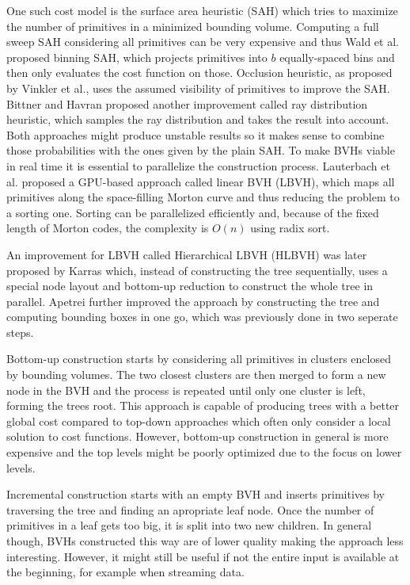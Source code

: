 One such cost model is the surface area heuristic (SAH)\cite{goldsmith_automatic_1987,macdonald_heuristics_1990} which tries to maximize the number of primitives in a minimized bounding volume. Computing a full sweep SAH considering all primitives can be very expensive and thus Wald et al.\cite{wald07fastConstruction} proposed binning SAH, which projects primitives into $b$ equally-spaced bins and then only evaluates the cost function on those.
Occlusion heuristic, as proposed by Vinkler et al.\cite{vinkler12visibility}, uses the assumed visibility of primitives to improve the SAH. Bittner and Havran\cite{bittner09rdh} proposed another improvement called ray distribution heuristic, which samples the ray distribution and takes the result into account. Both approaches might produce unstable results so it makes sense to combine those probabilities with the ones given by the plain SAH. 
To make BVHs viable in real time it is essential to parallelize the construction process. Lauterbach et al.\cite{lauterbach09lbvh} proposed a GPU-based approach called linear BVH (LBVH), which maps all primitives along the space-filling Morton curve\cite{morton66curve} and thus reducing the problem to a sorting one. Sorting can be parallelized efficiently and, because of the fixed length of Morton codes, the complexity is $O(n)$ using radix sort. 

An improvement for LBVH called Hierarchical LBVH (HLBVH) was later proposed by Karras\cite{karras12lbvh} which, instead of constructing the tree sequentially, uses a special node layout and bottom-up reduction to construct the whole tree in parallel. Apetrei\cite{apetrei14lbvh} further improved the approach by constructing the tree and computing bounding boxes in one go, which was previously done in two seperate steps. 

Bottom-up construction\cite{Walter2008FastAC} starts by considering all primitives in clusters enclosed by bounding volumes. The two closest clusters are then merged to form a new node in the BVH and the process is repeated until only one cluster is left, forming the trees root. 
This approach is capable of producing trees with a better global cost compared to top-down approaches which often only consider a local solution to cost functions. However, bottom-up construction in general is more expensive and the top levels might be poorly optimized due to the focus on lower levels.

Incremental construction\cite{goldsmith_automatic_1987} starts with an empty BVH and inserts primitives by traversing the tree and finding an apropriate leaf node. Once the number of primitives in a leaf gets too big, it is split into two new children. In general though, BVHs constructed this way are of lower quality making the approach less interesting. However, it might still be useful if not the entire input is available at the beginning, for example when streaming data.

